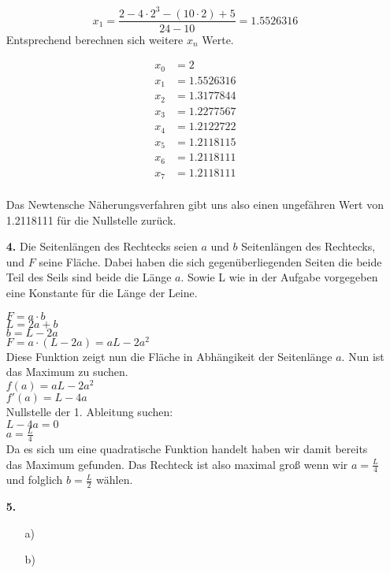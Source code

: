 \documentclass[a4paper,11pt]{scrartcl}
\begin{document}
\begin{enumerate}
        \[ x_1 = \frac{2 - 4 \cdot 2^3 - (10 \cdot 2) + 5}{24 - 10} = 1.5526316\]
        Entsprechend berechnen sich weitere \(x_n\) Werte.


        \begin{align*}
        x_0 &= 2 \\
        x_1 &= 1.5526316 \\
        x_2 &= 1.3177844 \\
        x_3 &= 1.2277567 \\
        x_4 &= 1.2122722 \\
        x_5 &= 1.2118115 \\
        x_6 &= 1.2118111 \\
        x_7 &= 1.2118111 \\
        \end{align*}

        Das Newtensche Näherungsverfahren gibt uns also einen ungefähren Wert von 1.2118111 für die Nullstelle zurück.

    \newpage
    \item[\textbf{4.}]
        Die Seitenlängen des Rechtecks seien $a$ und $b$ Seitenlängen des Rechtecks, und $F$ seine Fläche.
        Dabei haben die sich gegenüberliegenden Seiten die beide Teil des Seils sind beide die Länge $a$.
        Sowie L wie in der Aufgabe vorgegeben eine Konstante für die Länge der Leine.

        \(F = a \cdot b\) \\
        \(L = 2a + b\) \\
        \(b = L - 2a\) \\
        \(F = a \cdot (L - 2a) = aL - 2a^2\) \\
        Diese Funktion zeigt nun die Fläche in Abhängikeit der Seitenlänge $a$. Nun ist das Maximum zu suchen. \\
        \(f(a) = aL - 2a^2\) \\
        \(f'(a) = L - 4a\) \\
        Nullstelle der 1. Ableitung suchen: \\
        \(L - 4a = 0\) \\
        \(a = \frac{L}{4}\) \\
        Da es sich um eine quadratische Funktion handelt haben wir damit bereits das Maximum gefunden.
        Das Rechteck ist also maximal groß wenn wir $a = \frac{L}{4}$ und folglich $b = \frac{L}{2}$ wählen.
    \item[\textbf{5.}]
        \begin{enumerate}
            \item[a)]

            \item[b)]
        \end{enumerate}
    \end{enumerate}
\end{document}
